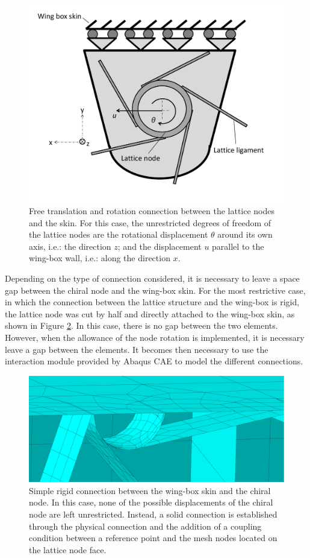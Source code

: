     \begin{figure}[!htpb]
      \centering
      \includegraphics[width=0.6 \textwidth]{figures/model/connectionModeling2}
      \caption[Free translation and rotation connection between the lattice nodes and the skin]{Free translation and rotation connection between the lattice nodes and the skin. For this case, the unrestricted degrees of freedom of the lattice nodes are the rotational displacement $\theta$ around its own axis, i.e.: the direction $z$; and the displacement $u$ parallel to the wing-box wall, i.e.: along the direction $x$.}\label{fig:connectionModeling2}
    \end{figure}

    Depending on the type of connection considered, it is necessary to leave a space gap between the chiral node and the wing-box skin. For the most restrictive case, in which the connection between the lattice structure and the wing-box is rigid, the lattice node was cut by half and directly attached to the wing-box skin, as shown in Figure \ref{fig:chiralNodeCut}. In this case, there is no gap between the two elements. However, when the allowance of the node rotation is implemented, it is necessary leave a gap between the elements. It becomes then necessary to use the interaction module provided by Abaqus CAE to model the different connections. %

    \begin{figure}[!htpb]
      \centering
      \includegraphics[width=0.8 \textwidth]{figures/model/chiralNodeCut}
      \caption[Simple rigid connection between the wing-box skin and the chiral node]{Simple rigid connection between the wing-box skin and the chiral node. In this case, none of the possible displacements of the chiral node are left unrestricted. Instead, a solid connection is established through the physical connection and the addition of a coupling condition between a reference point and the mesh nodes located on the lattice node face.}
      \label{fig:chiralNodeCut}
    \end{figure} 

